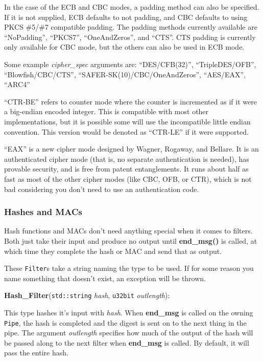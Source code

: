 \documentclass{article}
\newcommand{\function}[1]{\textbf{#1}}
\newcommand{\type}[1]{\texttt{#1}}
\renewcommand{\arg}[1]{\textsl{#1}}
\begin{document}
In the case of the ECB and CBC modes, a padding method can also be
specified. If it is not supplied, ECB defaults to not padding, and CBC defaults
to using PKCS \#5/\#7 compatible padding. The padding methods currently
available are ``NoPadding'', ``PKCS7'', ``OneAndZeros'', and ``CTS''. CTS
padding is currently only available for CBC mode, but the others can also be
used in ECB mode.

Some example \arg{cipher\_spec} arguments are: ``DES/CFB(32)'',
``TripleDES/OFB'', ``Blowfish/CBC/CTS'', ``SAFER-SK(10)/CBC/OneAndZeros'',
``AES/EAX'', ``ARC4''

``CTR-BE'' refers to counter mode where the counter is incremented as if it
were a big-endian encoded integer. This is compatible with most other
implementations, but it is possible some will use the incompatible little
endian convention. This version would be denoted as ``CTR-LE'' if it were
supported.

``EAX'' is a new cipher mode designed by Wagner, Rogaway, and Bellare. It is an
authenticated cipher mode (that is, no separate authentication is needed), has
provable security, and is free from patent entanglements. It runs about half as
fast as most of the other cipher modes (like CBC, OFB, or CTR), which is not
bad considering you don't need to use an authentication code.

\subsubsection{Hashes and MACs}

Hash functions and MACs don't need anything special when it comes to
filters. Both just take their input and produce no output until
\function{end\_msg()} is called, at which time they complete the hash or MAC
and send that as output.

These \type{Filter}s take a string naming the type to be used. If for some
reason you name something that doesn't exist, an exception will be thrown.

\noindent
\function{Hash\_Filter}(\type{std::string} \arg{hash},
                        \type{u32bit} \arg{outlength}):

This type hashes it's input with \arg{hash}. When \function{end\_msg} is called
on the owning \type{Pipe}, the hash is completed and the digest is sent on to
the next thing in the pipe. The argument \arg{outlength} specifies how much of
the output of the hash will be passed along to the next filter when
\function{end\_msg} is called. By default, it will pass the entire hash.
\end{document}
